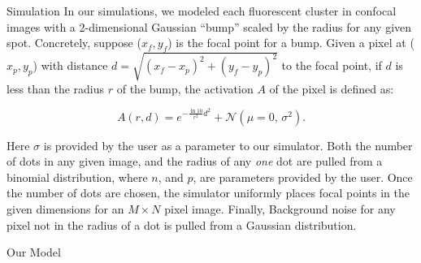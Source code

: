 \documentclass[final]{beamer}
\newlength{\onecolwid}
\begin{document}
\begin{frame}[t]
\begin{columns}[t]
\begin{column}{\onecolwid}
\begin{block}{Simulation}
In our simulations, we modeled each fluorescent cluster in confocal images with a 2-dimensional Gaussian ``bump'' scaled by the radius for any given spot. Concretely, suppose ($x_{f}, y_{f}$) is the focal point for a bump. Given a pixel at ($x_{p}, y_{p}$) with distance $d = \sqrt{(x_{f} - x_{p})^{2} + (y_{f} - y_{p})^{2}}$ to the focal point, if $d$ is less than the radius $r$ of the bump, the activation $A$ of the pixel is defined as: 

\Large
\begin{equation}
    A(r,d) = e^{-\frac{\ln{10}}{r^{2}}d^{2}} + \mathcal{N}(\mu = 0,\,\sigma^{2}).
\end{equation}
\normalsize
\vspace{0.1in}

Here $\sigma$ is provided by the user as a parameter to our simulator.
Both the number of dots in any given image, and the radius of any \textit{one} dot are pulled from a binomial distribution, where $n$, and $p$, are parameters provided by the user. Once the number of dots are chosen, the simulator uniformly places focal points in the given dimensions for an $M \times N$ pixel image. Finally, Background noise for any pixel not in the radius of a dot is pulled from a Gaussian distribution.

\end{block}

\begin{block}{Our Model}



\end{block}
\end{column}
\end{columns}
\end{frame}
\end{document}
